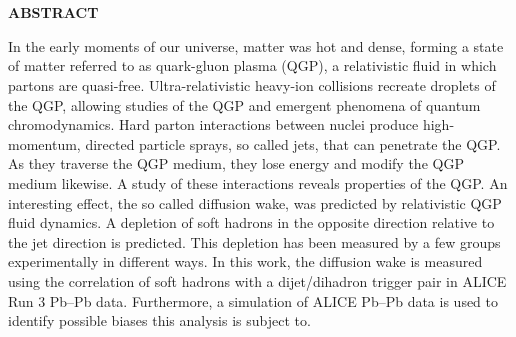 \documentclass[
  a4paper,
  12pt,
  oneside,
  parskip=half,
  listof=totoc,
  bibliography=totoc,
  DIV=12,
  numbers=noenddot
  ]{scrartcl}
\begin{document}
\newpage

\thispagestyle{empty}
\mbox{}

\newpage


\section*{}

\setcounter{page}{1}

\begin{center}
	\textbf{ABSTRACT}
\end{center}

In the early moments of our universe, matter was hot and dense, forming a state of matter referred to as quark-gluon plasma (QGP), a relativistic fluid in which partons are quasi-free. Ultra-relativistic heavy-ion collisions recreate droplets of the QGP, allowing studies of the QGP and emergent phenomena of quantum chromodynamics. Hard parton interactions between nuclei produce high-momentum, directed particle sprays, so called jets, that can penetrate the QGP. As they traverse the QGP medium, they lose energy and modify the QGP medium likewise. A study of these interactions reveals properties of the QGP. An interesting effect, the so called diffusion wake, was predicted by relativistic QGP fluid dynamics. A depletion of soft hadrons in the opposite direction relative to the jet direction is predicted. This depletion has been measured by a few groups experimentally in different ways. In this work, the diffusion wake is measured using the correlation of soft hadrons with a dijet/dihadron trigger pair in ALICE Run 3 Pb--Pb data. Furthermore, a simulation of ALICE Pb--Pb data is used to identify possible biases this analysis is subject to.

\newpage

\mbox{}

\newpage

\tableofcontents

\newpage

\mbox{}

\newpage

\newpage



\pagebreak



\pagebreak


\end{document}
